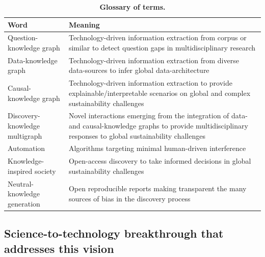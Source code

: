 \documentclass[11pt, a4paper]{article} %
\begin{document}
   
\begin{table}[ht]
\begin{tabular}{ p{6cm} | p{11cm}}
  \hline \hline
  \textbf{Word} &\textbf{Meaning}\\  \hline
  Question-knowledge graph & Technology-driven information extraction from corpus or similar to detect question gaps in multidisciplinary research\\ \hline
  Data-knowledge graph & Technology-driven information extraction from diverse data-sources to infer global data-architecture \\ \hline
  Causal-knowledge graph & Technology-driven information extraction to provide explainable/interpretable scenarios on global and complex sustainability challenges\\ \hline
  Discovery-knowledge multigraph & Novel interactions emerging from the integration of data- and causal-knowledge graphs to provide multidisciplinary responses to global sustainability challenges\\ \hline
  Automation & Algorithms targeting minimal human-driven interference\\ \hline
  Knowledge-inspired society & Open-access discovery to take informed decisions in global sustainability challenges \\ \hline
  Neutral-knowledge generation & Open reproducible reports making transparent the many sources of bias in the discovery process\\ \hline
  \bottomrule
\end{tabular}
\caption{{\bf Glossary of terms.}}
\end{table}

\subsection{Science-to-technology breakthrough that addresses this vision}
\end{document}
